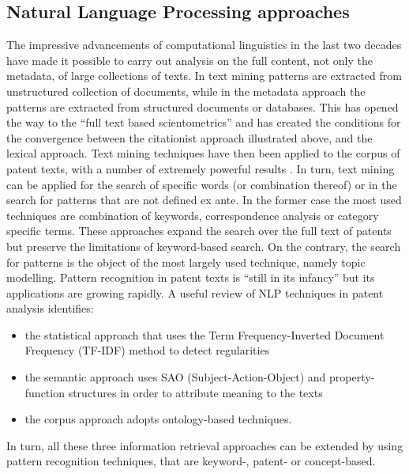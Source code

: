 \documentclass[]{book}
\providecommand{\tightlist}{%
  \setlength{\itemsep}{0pt}\setlength{\parskip}{0pt}}
\begin{document}
\subsection{Natural Language Processing
approaches}\label{natural-language-processing-approaches}

The impressive advancements of computational linguistics in the last two
decades have made it possible to carry out analysis on the full content,
not only the metadata, of large collections of texts. In text mining
patterns are extracted from unstructured collection of documents, while
in the metadata approach the patterns are extracted from structured
documents or databases. This has opened the way to the ``full text based
scientometrics'' \citep{boyack2013improving} and has created the
conditions for the convergence between the citationist approach
illustrated above, and the lexical approach. Text mining techniques have
then been applied to the corpus of patent texts, with a number of
extremely powerful results
\citep{tseng2007text, joung2017monitoring, kreuchauff2017patent, ozcan2017patent, yoon2012detecting}.
In turn, text mining can be applied for the search of specific words (or
combination thereof) or in the search for patterns that are not defined
ex ante. In the former case the most used techniques are combination of
keywords, correspondence analysis or category specific terms. These
approaches expand the search over the full text of patents but preserve
the limitations of keyword-based search. On the contrary, the search for
patterns is the object of the most largely used technique, namely topic
modelling. Pattern recognition in patent texts is ``still in its
infancy'' \citep{madani2016evolution} but its applications are growing
rapidly. A useful review of NLP techniques in patent analysis
\citep{madani2016evolution} identifies:

\begin{itemize}
\tightlist
\item
  the statistical approach that uses the Term Frequency-Inverted
  Document Frequency (TF-IDF) method to detect regularities
\item
  the semantic approach uses SAO (Subject-Action-Object) and
  property-function structures in order to attribute meaning to the
  texts
\item
  the corpus approach adopts ontology-based techniques.
\end{itemize}

In turn, all these three information retrieval approaches can be
extended by using pattern recognition techniques, that are keyword-,
patent- or concept-based.
\end{document}
